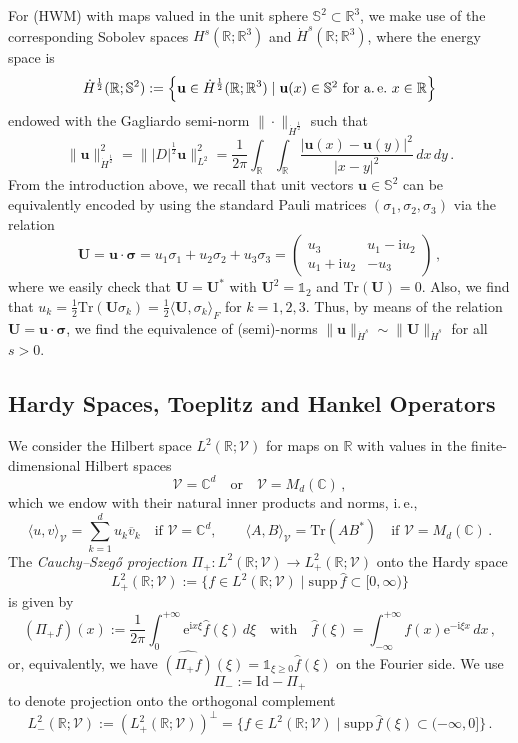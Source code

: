 \documentclass[11pt,reqno]{amsart}
\theoremstyle{definition}
\theoremstyle{remark}
\theoremstyle{remark}
\numberwithin{equation}{section}
\newcommand{\C}{\mathbb{C}}
\newcommand{\R}{\mathbb{R}}
\newcommand{\Ss}{\mathbb{S}}
\newcommand{\VV}{\mathcal{V}}
\newcommand{\ov}{\overline}
\newcommand{\ii}{\mathrm{i}}
\newcommand{\eu}{\mathrm{e}}
\newcommand{\uu}{\mathbf{u}}
\newcommand{\Ub}{\mathbf{U}}
\newcommand{\id}{\mathrm{Id}}
\newcommand{\Tr}{\mathrm{Tr}}
\begin{document}
\medskip
For (HWM) with maps valued in the unit sphere $\Ss^2 \subset \R^3$, we make use of the corresponding Sobolev spaces $H^s(\R; \R^3)$ and $\dot{H}^s(\R; \R^3)$, where the energy space is 
$$
\dot{H}^{\frac 1 2}(\R; \Ss^2) := \left \{ \uu \in \dot{H}^{\frac 1 2}(\R; \R^3) \mid \mbox{$\uu(x) \in \Ss^2$ for a.\,e.~$x \in \R$} \right \} 
$$
endowed with the Gagliardo semi-norm $\| \cdot \|_{\dot{H}^{\frac 1 2}}$ such that
$$
\| \uu \|_{\dot{H}^{\frac 1 2}}^2 = \| |D|^{\frac 1 2} \uu \|_{L^2}^2 = \frac{1}{2 \pi} \int_{\R} \! \int_{\R} \frac{|\uu(x)- \uu(y)|^2}{|x-y|^2} \, dx \, dy \, .
$$
From the introduction above, we recall that unit vectors $\uu \in \Ss^2$ can be equivalently encoded by using the standard Pauli matrices $(\sigma_1, \sigma_2, \sigma_3)$ via the relation
$$
\Ub = \uu \cdot \bm{\sigma} = u_1 \sigma_1 +u_2 \sigma_2 + u_3 \sigma_3 = \left ( \begin{array}{cc} u_3 & u_1 - \ii u_2 \\ u_1 + \ii u_2 & -u_3 \end{array} \right ) \, ,
$$
where we easily check that $\Ub = \Ub^*$ with $\Ub^2 = \mathds{1}_2$ and $\Tr(\Ub) = 0$. Also, we find that $u_k= \frac{1}{2} \Tr(\Ub \sigma_k) = \frac{1}{2} \langle \Ub, \sigma_k \rangle_F$ for $k=1,2,3$. Thus, by means of the relation $\Ub = \uu \cdot \bm{\sigma}$, we find the equivalence of (semi)-norms $\| \uu \|_{\dot{H}^{s}} \sim \| \Ub \|_{\dot{H}^{s}}$ for all $s>0$. 




\subsection*{Hardy Spaces, Toeplitz and Hankel Operators}
We consider the Hilbert space $L^2(\R; \VV)$ for maps on $\R$ with values in the finite-dimensional Hilbert spaces 
$$
\VV = \C^d \quad \mbox{or} \quad \VV = M_d(\C) \, ,
$$
which we endow with their natural inner products and norms, i.\,e.,
$$
\langle u,v \rangle_{\VV} = \sum_{k=1}^d u_k \ov{v}_k \quad \mbox{if $\VV= \C^d$}, \qquad \langle A,B \rangle_\VV = \Tr(A B^*) \quad \mbox{if $\VV = M_d(\C)$} \, .
$$
The {\em Cauchy--Szeg\H{o} projection} $\Pi_+ : L^2(\R; \VV) \to L^2_+(\R;\VV)$ onto the Hardy space
$$
L^2_+(\R; \VV) := \{ f \in L^2(\R; \VV) \mid \mathrm{supp} \, \widehat{f} \subset [0, \infty) \}
$$
is given by
$$
(\Pi_+ f)(x) := \frac{1}{2 \pi} \int_0^{+\infty} \eu^{\ii x \xi} \widehat{f}(\xi) \, d\xi \quad \mbox{with} \quad \widehat{f}(\xi) = \int_{-\infty}^{+\infty} f(x) \eu^{-\ii \xi x} \, dx \, ,
$$ 
or, equivalently, we have $\widehat{(\Pi_+ f)}(\xi) = \mathds{1}_{\xi \geq 0} \widehat{f}(\xi)$  on the Fourier side. We use 
$$
\Pi_- := \id - \Pi_+
$$
 to denote projection onto the orthogonal complement 
$$
L^2_-(\R; \VV) := (L^2_+(\R;\VV))^\perp = \{ f \in L^2(\R;\VV) \mid \mathrm{supp} \, \widehat{f}(\xi) \subset (-\infty,0] \}\, .
$$
\end{document}

